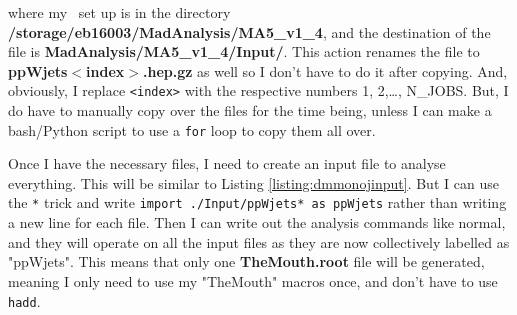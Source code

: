where my \madanalysis\ set up is in the directory \textbf{/storage/eb16003/MadAnalysis/MA5\_v1\_4}, and the destination of the file is \textbf{MadAnalysis/MA5\_v1\_4/Input/}. This action renames the file to \textbf{ppWjets$<$index$>$.hep.gz} as well so I don't have to do it after copying. And, obviously, I replace \verb!<index>! with the respective numbers 1, 2,\ldots, N\_JOBS. But, I do have to manually copy over the files for the time being, unless I can make a bash/Python script to use a \verb!for! loop to copy them all over. 


Once I have the necessary files, I need to create an input file to analyse everything. This will be similar to Listing \ref{listing:dmmonojinput}. But I can use the \verb!*! trick and write \verb!import ./Input/ppWjets* as ppWjets! rather than writing a new line for each file. Then I can write out the analysis commands like normal, and they will operate on all the input files as they are now collectively labelled as "ppWjets". This means that only one \textbf{TheMouth.root} file will be generated, meaning I only need to use my "TheMouth" macros once, and don't have to use \verb!hadd!.

